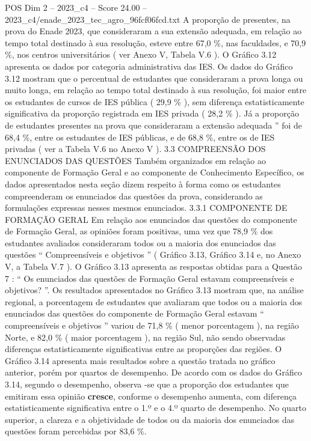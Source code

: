\begin{textsample}{POS Dim 2 – 2023\_c4 – Score 24.00 – 2023\_c4/enade\_2023\_tec\_agro\_96fcf06fcd.txt}
A proporção de presentes, na prova do Enade 2023, que consideraram a sua extensão adequada, em relação ao tempo total destinado à sua resolução, esteve entre 67,0 \%, nas faculdades, e 70,9 \%, nos centros universitários ( ver Anexo V, Tabela V.6 ).
O Gráfico 3.12 apresenta os dados por categoria administrativa das IES.
Os dados do Gráfico 3.12 mostram que o percentual de estudantes que consideraram a prova longa ou muito longa, em relação ao tempo total destinado à sua resolução, foi maior entre os estudantes de cursos de IES pública ( 29,9 \% ), sem diferença estatisticamente significativa da proporção registrada em IES privada ( 28,2 \% ).
Já a proporção de estudantes presentes na prova que consideraram a extensão adequada ” foi de 68,4 \%, entre os estudantes de IES públicas, e de 68,8 \%, entre os de IES privadas ( ver a Tabela V.6 no Anexo V ). 3.3 COMPREENSÃO DOS ENUNCIADOS DAS QUESTÕES Também organizados em relação ao componente de Formação Geral e ao componente de Conhecimento Específico, os dados apresentados nesta seção dizem respeito à forma como os estudantes compreenderam os enunciados das questões da prova, considerando as formulações expressas nesses mesmos enunciados. 3.3.1 COMPONENTE DE FORMAÇÃO GERAL Em relação aos enunciados das questões do componente de Formação Geral, as opiniões foram positivas, uma vez que 78,9 \% dos estudantes avaliados consideraram todos ou a maioria dos enunciados das questões “ Compreensíveis e objetivos ” ( Gráfico 3.13, Gráfico 3.14 e, no Anexo V, a Tabela V.7 ).
O Gráfico 3.13 apresenta as respostas obtidas para a Questão 7 : “ Os enunciados das questões de Formação Geral estavam compreensíveis e objetivos? ”.
Os resultados apresentados no Gráfico 3.13 mostram que, na análise regional, a porcentagem de estudantes que avaliaram que todos ou a maioria dos enunciados das questões do componente de Formação Geral estavam “ compreensíveis e objetivos ” variou de 71,8 \% ( menor porcentagem ), na região Norte, e 82,0 \% ( maior porcentagem ), na região Sul, não sendo observadas diferenças estatisticamente significativas entre as proporções das regiões.
O Gráfico 3.14 apresenta mais resultados sobre a questão tratada no gráfico anterior, porém por quartos de desempenho.
De acordo com os dados do Gráfico 3.14, segundo o desempenho, observa -se que a proporção dos estudantes que emitiram essa opinião \textbf{cresce}, conforme o desempenho aumenta, com diferença estatisticamente significativa entre o 1.º e o 4.º quarto de desempenho.
No quarto superior, a clareza e a objetividade de todos ou da maioria dos enunciados das questões foram percebidas por 83,6 \%.

\end{textsample}
